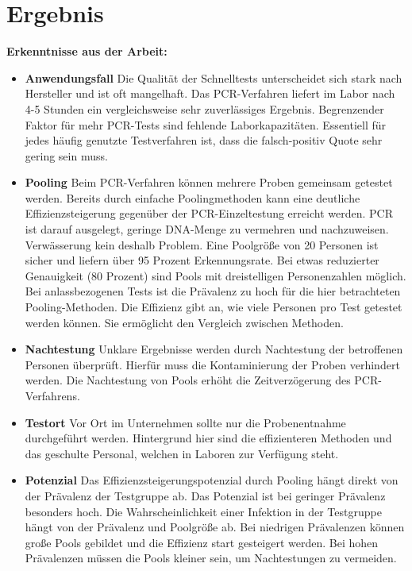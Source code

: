 \chapter{Ergebnis}
 \textbf{Erkenntnisse aus der Arbeit:}
\begin{itemize}
	\item \textbf{Anwendungsfall}
	Die Qualität der Schnelltests unterscheidet sich stark nach Hersteller und ist oft mangelhaft.
	Das PCR-Verfahren liefert im Labor nach 4-5 Stunden ein vergleichsweise sehr zuverlässiges Ergebnis.
	Begrenzender Faktor für mehr PCR-Tests sind fehlende Laborkapazitäten.
    Essentiell für jedes häufig genutzte Testverfahren ist, dass die falsch-positiv Quote sehr gering sein muss.
	
	\item \textbf{Pooling}
	Beim PCR-Verfahren können mehrere Proben gemeinsam getestet werden.
	Bereits durch einfache Poolingmethoden kann eine deutliche Effizienzsteigerung gegenüber der PCR-Einzeltestung erreicht werden.
	PCR ist darauf ausgelegt, geringe DNA-Menge zu vermehren und nachzuweisen.
	Verwässerung kein deshalb Problem.
	Eine Poolgröße von 20 Personen ist sicher und liefern über 95 Prozent Erkennungsrate.
	Bei etwas reduzierter Genauigkeit (80 Prozent) sind Pools mit dreistelligen Personenzahlen möglich.
	Bei anlassbezogenen Tests ist die Prävalenz zu hoch für die hier betrachteten Pooling-Methoden.
	Die Effizienz gibt an, wie viele Personen pro Test getestet werden können.
	Sie ermöglicht den Vergleich zwischen Methoden.
	
	\item \textbf{Nachtestung}
	Unklare Ergebnisse werden durch Nachtestung der betroffenen Personen überprüft.
	Hierfür muss die Kontaminierung der Proben  verhindert werden.
	Die Nachtestung von Pools erhöht die Zeitverzögerung des PCR-Verfahrens.
	
	\item \textbf{Testort}
	Vor Ort im Unternehmen sollte nur die Probenentnahme durchgeführt werden.
	Hintergrund hier sind die effizienteren Methoden und das geschulte Personal, welchen in Laboren zur Verfügung steht.
		
	\item \textbf{Potenzial}
	Das Effizienzsteigerungspotenzial durch Pooling hängt direkt von der Prävalenz der Testgruppe ab.
	Das Potenzial ist bei geringer Prävalenz besonders hoch.
	Die Wahrscheinlichkeit einer Infektion in der Testgruppe hängt von der Prävalenz und Poolgröße ab.
	Bei niedrigen Prävalenzen können große Pools gebildet und die Effizienz start gesteigert werden.
	Bei hohen Prävalenzen müssen die Pools kleiner sein, um Nachtestungen zu vermeiden.
	

\end{itemize}
